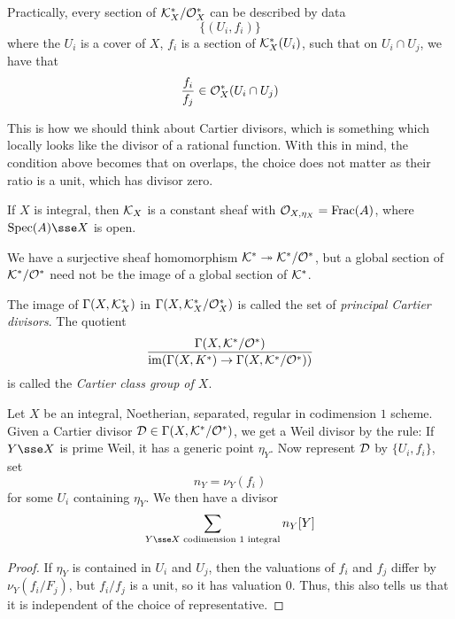 \documentclass{article}
\begin{document}
Practically, every section of \(\mathcal{K}_X^*/\mathcal{O}_X^*\) can be described by data
\[\{(U_i, f_i)\}\]
where the \(U_i\) is a cover of \(X\), \(f_i\) is a section of \(\mathcal{K}_X^*(U_i)\), such that on \(U_i \cap U_j\), we have that
\[\frac{f_i}{f_j} \in \mathcal{O}_X^*(U_i \cap U_j)\]

\begin{addendum}
    This is how we should think about Cartier divisors, which is something which locally looks like the divisor of a rational function. With this in mind, the condition above becomes that on overlaps, the choice does not matter as their ratio is a unit, which has divisor zero.
\end{addendum}

\lec

If \(X\) is integral, then \(\mathcal{K}_X\) is a constant sheaf with \(\mathcal{O}_{X, \eta_X} = \operatorname{Frac}(A)\), where \(\Spec(A) \sse X\) is open.

We have a surjective sheaf homomorphism \(\mathcal{K}^* \twoheadrightarrow \mathcal{K}^*/\mathcal{O}^*\), but a global section of \(\mathcal{K}^*/\mathcal{O}^*\) need not be the image of a global section of \(\mathcal{K}^*\).

\begin{definition}
    The image of \(\Gamma(X, \mathcal{K}^*_X)\) in \(\Gamma(X, \mathcal{K}^*_X/\mathcal{O}^*_X)\) is called the set of \emph{principal Cartier divisors}. The quotient
    \[\frac{\Gamma(X, \mathcal{K}^*/\mathcal{O}^*)}{\operatorname{im}(\Gamma(X, K^*) \to \Gamma(X, \mathcal{K}^*/\mathcal{O}^*))}\]
    is called the \emph{Cartier class group of \(X\)}.
\end{definition}

\begin{proposition}
    Let \(X\) be an integral, Noetherian, separated, regular in codimension \(1\) scheme. Given a Cartier divisor \(\mathcal{D} \in \Gamma(X, \mathcal{K}^*/\mathcal{O}^*)\), we get a Weil divisor by the rule: If \(Y \sse X\) is prime Weil, it has a generic point \(\eta_Y\). Now represent \(\mathcal{D}\) by \(\{U_i, f_i\}\), set
    \[n_Y = \nu_Y(f_i)\]
    for some \(U_i\) containing \(\eta_Y\). We then have a divisor
    \[\sum_{Y \sse X \text{ codimension }1\text{ integral}}n_Y[Y]\]
\end{proposition}

\begin{proof}
    If \(\eta_Y\) is contained in \(U_i\) and \(U_j\), then the valuations of \(f_i\) and \(f_j\) differ by \(\nu_Y(f_i/F_j)\), but \(f_i/f_j\) is a unit, so it has valuation \(0\). Thus, this also tells us that it is independent of the choice of representative.
\end{proof}
\end{document}
